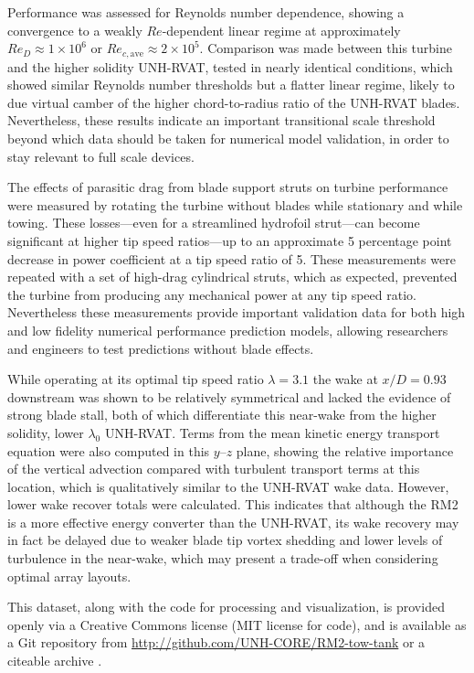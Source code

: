 \documentclass[10pt,letterpaper]{article}
\begin{document}
Performance was assessed for Reynolds number dependence, showing a convergence
to a weakly $Re$-dependent linear regime at approximately $Re_D \approx 1 \times
10^6$ or $Re_{c,\mathrm{ave}} \approx 2 \times 10^5$. Comparison was made
between this turbine and the higher solidity UNH-RVAT, tested in nearly
identical conditions, which showed similar Reynolds number thresholds but a
flatter linear regime, likely to due virtual camber of the higher
chord-to-radius ratio of the UNH-RVAT blades. Nevertheless, these results
indicate an important transitional scale threshold beyond which data should be
taken for numerical model validation, in order to stay relevant to full scale
devices.

The effects of parasitic drag from blade support struts on turbine performance
were measured by rotating the turbine without blades while stationary and while
towing. These losses---even for a streamlined hydrofoil strut---can become
significant at higher tip speed ratios---up to an approximate 5 percentage point
decrease in power coefficient at a tip speed ratio of 5. These measurements were
repeated with a set of high-drag cylindrical struts, which as expected,
prevented the turbine from producing any mechanical power at any tip speed
ratio. Nevertheless these measurements provide important validation data for
both high and low fidelity numerical performance prediction models, allowing
researchers and engineers to test predictions without blade effects.

While operating at its optimal tip speed ratio $\lambda=3.1$ the wake at
$x/D=0.93$ downstream was shown to be relatively symmetrical and lacked the
evidence of strong blade stall, both of which differentiate this near-wake from
the higher solidity, lower $\lambda_0$ UNH-RVAT. Terms from the mean kinetic
energy transport equation were also computed in this $y$--$z$ plane, showing the
relative importance of the vertical advection compared with turbulent transport
terms at this location, which is qualitatively similar to the UNH-RVAT wake
data. However, lower wake recover totals were calculated. This indicates that
although the RM2 is a more effective energy converter than the UNH-RVAT, its
wake recovery may in fact be delayed due to weaker blade tip vortex shedding and
lower levels of turbulence in the near-wake, which may present a trade-off when
considering optimal array layouts.

This dataset, along with the code for processing and visualization, is provided
openly via a Creative Commons license (MIT license for code), and is available
as a Git repository from \url{http://github.com/UNH-CORE/RM2-tow-tank} or a
citeable archive \cite{Bachant2015-RM2-data}.
\end{document}
